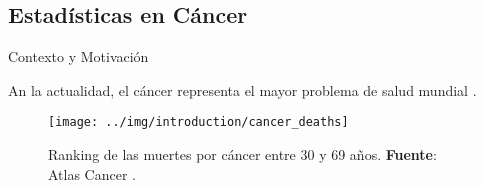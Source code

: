 \documentclass[10pt]{beamer}
\newcommand{\1}{
	\setbeamertemplate{background}{
		\texttt{[image: img/1]}
		\tikz[overlay] \fill[fill opacity=0.75,fill=white] (0,0) rectangle (-\paperwidth,\paperheight);
	}
}
\begin{document}
\subsection{Estadísticas en Cáncer}


\begin{frame}{Contexto y Motivación}{}
	\begin{block}{}
		An la actualidad, el cáncer representa el mayor problema de salud mundial \cite{siegel2023cancer}.
	\end{block}

	\begin{figure}[]
		\centering
		\texttt{[image: ../img/introduction/cancer\_deaths]}
		\caption{Ranking de las muertes por cáncer entre 30 y 69 años. \textbf{Fuente}: Atlas Cancer \cite{canceratlas2023}.}
	\end{figure}
\end{frame}



\end{document}
